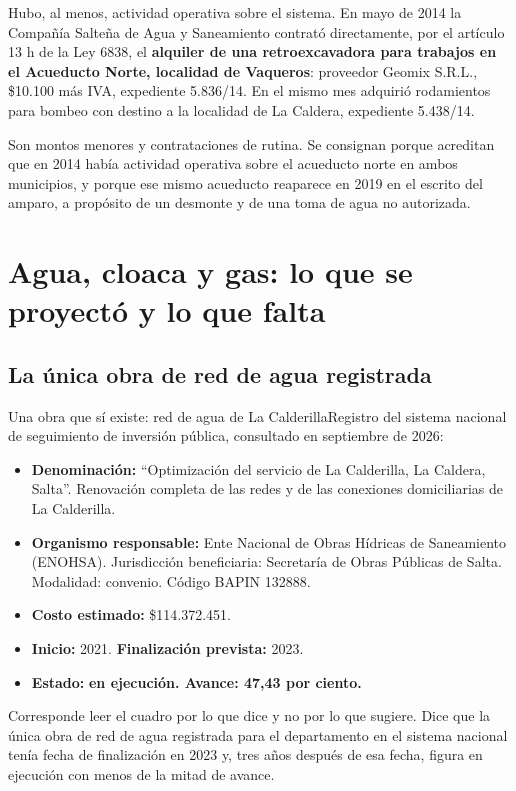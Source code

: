 Hubo, al menos, actividad operativa sobre el sistema. En mayo de 2014 la Compañía Salteña de Agua y Saneamiento contrató directamente, por el artículo 13 h de la Ley 6838, el \textbf{alquiler de una retroexcavadora para trabajos en el Acueducto Norte, localidad de Vaqueros}: proveedor Geomix S.R.L., \$10.100 más IVA, expediente 5.836/14. En el mismo mes adquirió rodamientos para bombeo con destino a la localidad de La Caldera, expediente 5.438/14.

Son montos menores y contrataciones de rutina. Se consignan porque acreditan que en 2014 había actividad operativa sobre el acueducto norte en ambos municipios, y porque ese mismo acueducto reaparece en 2019 en el escrito del amparo, a propósito de un desmonte y de una toma de agua no autorizada.

\section{Agua, cloaca y gas: lo que se proyectó y lo que falta}

\subsection*{La única obra de red de agua registrada}

\begin{ficha}{Una obra que sí existe: red de agua de La Calderilla}Registro del sistema nacional de seguimiento de inversión pública, consultado en septiembre de 2026:
\begin{itemize}[leftmargin=*,nosep]
\item \textbf{Denominación:} ``Optimización del servicio de La Calderilla, La Caldera, Salta''. Renovación completa de las redes y de las conexiones domiciliarias de La Calderilla.
\item \textbf{Organismo responsable:} Ente Nacional de Obras Hídricas de Saneamiento (ENOHSA). Jurisdicción beneficiaria: Secretaría de Obras Públicas de Salta. Modalidad: convenio. Código BAPIN 132888.
\item \textbf{Costo estimado:} \$114.372.451.
\item \textbf{Inicio:} 2021. \textbf{Finalización prevista:} 2023.
\item \textbf{Estado:} \textbf{en ejecución. Avance: 47,43 por ciento.}
\end{itemize}
\end{ficha}

Corresponde leer el cuadro por lo que dice y no por lo que sugiere. Dice que la única obra de red de agua registrada para el departamento en el sistema nacional tenía fecha de finalización en 2023 y, tres años después de esa fecha, figura en ejecución con menos de la mitad de avance.

